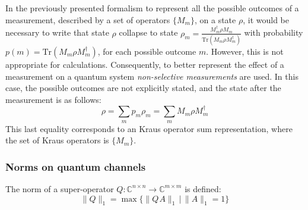 In the previously presented formalism to represent all the possible outcomes of a measurement, described by a set of operators $\{M_{m}\}$, on a state $\rho$, it would be necessary to write that state $\rho$ collapse to state $\rho_m=\frac{M_{m}^{\dag}\rho M_{m}}{\text{Tr}(M_{m}\rho M_{m}^{\dag})}$ with probability $p(m)=\text{Tr}(M_{m}\rho M_{m}^{\dag})$, for each possible outcome $m$. However, this is not appropriate for calculations. Consequently, to better represent the effect of a measurement on a quantum system \emph{non-selective measurements} are used. In this case, the possible outcomes are not explicitly stated, and the state after the measurement is as follows:
\begin{equation*}
  \rho = \sum_{m} p_m \rho_m = \sum_{m} M_m \rho M^{\dag}_m
\end{equation*}
This last equality corresponds to an Kraus operator sum representation, where the set of Kraus operators is $\{M_{m}\}$.






\subsubsection{Norms on quantum channels}
\begin{definition}
  The norm of a super-operator $Q: \mathbb{C}^{n\times n} \xrightarrow{} \mathbb{C}^{m\times m }$ is defined:
  \begin{equation} 
    \lVert Q \rVert_{1} =  \max\{\lVert Q \hspace{1pt} A \rVert_{1} \hspace{2pt}  \vert \hspace{2pt}  \lVert A \rVert_{1}=1\} 
  \end{equation}
\end{definition}

